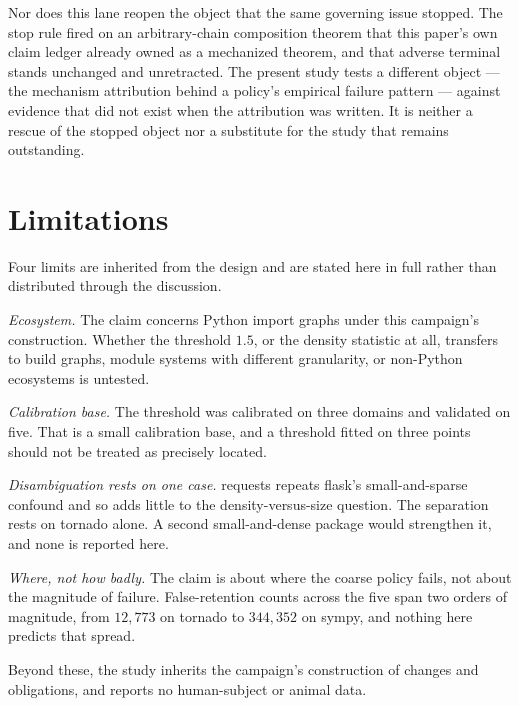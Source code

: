 \documentclass[11pt]{article}
\begin{document}
Nor does this lane reopen the object that the same governing issue stopped. The stop rule fired on an arbitrary-chain composition theorem that this paper's own claim ledger already owned as a mechanized theorem, and that adverse terminal stands unchanged and unretracted. The present study tests a different object --- the mechanism attribution behind a policy's empirical failure pattern --- against evidence that did not exist when the attribution was written. It is neither a rescue of the stopped object nor a substitute for the study that remains outstanding.

\section{Limitations}
Four limits are inherited from the design and are stated here in full rather than distributed through the discussion.

\emph{Ecosystem.} The claim concerns Python import graphs under this campaign's construction. Whether the threshold $1.5$, or the density statistic at all, transfers to build graphs, module systems with different granularity, or non-Python ecosystems is untested.

\emph{Calibration base.} The threshold was calibrated on three domains and validated on five. That is a small calibration base, and a threshold fitted on three points should not be treated as precisely located.

\emph{Disambiguation rests on one case.} requests repeats flask's small-and-sparse confound and so adds little to the density-versus-size question. The separation rests on tornado alone. A second small-and-dense package would strengthen it, and none is reported here.

\emph{Where, not how badly.} The claim is about where the coarse policy fails, not about the magnitude of failure. False-retention counts across the five span two orders of magnitude, from $12{,}773$ on tornado to $344{,}352$ on sympy, and nothing here predicts that spread.

Beyond these, the study inherits the campaign's construction of changes and obligations, and reports no human-subject or animal data.
\end{document}
